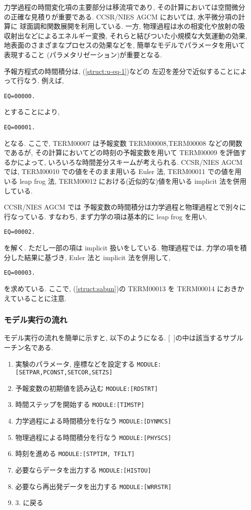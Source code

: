力学過程の時間変化項の主要部分は移流項であり,
その計算においては空間微分の正確な見積りが重要である.
CCSR/NIES AGCM においては, 水平微分項の計算に
球面調和関数展開を利用している.
一方, 物理過程は水の相変化や放射の吸収射出などによるエネルギー変換, 
それらと結びついた小規模な大気運動の効果, 
地表面のさまざまなプロセスの効果などを, 
簡単なモデルでパラメータを用いて表現すること
(パラメタリゼーション)が重要となる.

予報方程式の時間積分は,
(\ref{struct:u-eq-1})などの
左辺を差分で近似することによって行なう. 例えば,
%
\begin{verbatim}
EQ=00000.
\end{verbatim}
%
とすることにより, 
\begin{verbatim}
EQ=00001.
\end{verbatim}
となる. 
ここで, TERM00007 は予報変数 TERM00008,TERM00008 などの関数であるが,
その計算においてどの時刻の予報変数を用いて TERM00009 を評価するかによって,
いろいろな時間差分スキームが考えられる.
CCSR/NIES AGCM では, 
TERM00010 での値をそのまま用いる Euler 法,
TERM00011 での値を用いる leap frog 法, 
TERM00012 における(近似的な)値を用いる implicit 法を併用している.

CCSR/NIES AGCM では
予報変数の時間積分は力学過程と物理過程とで別々に行なっている.
すなわち, まず力学の項は基本的に leap frog を用い,
\begin{verbatim}
EQ=00002.
\end{verbatim}
を解く. ただし一部の項は implicit 扱いをしている.
物理過程では,
力学の項を積分した結果に基づき, 
Euler 法と implicit 法を併用して,
\begin{verbatim}
EQ=00003.
\end{verbatim}
を求めている. 
ここで, (\ref{struct:sabun})の TERM00013 を
TERM00014 におきかえていることに注意.

\subsubsection{モデル実行の流れ}

モデル実行の流れを簡単に示すと, 以下のようになる.
[\ ]の中は該当するサブルーチン名である.

\begin{enumerate}
\item 実験のパラメータ, 座標などを設定する \texttt{MODULE:[SETPAR,PCONST,SETCOR,SETZS]}
\item 予報変数の初期値を読み込む \texttt{MODULE:[RDSTRT]}
\item 時間ステップを開始する \texttt{MODULE:[TIMSTP]}
\item 力学過程による時間積分を行なう \texttt{MODULE:[DYNMCS]}
\item 物理過程による時間積分を行なう \texttt{MODULE:[PHYSCS]}
\item 時刻を進める \texttt{MODULE:[STPTIM, TFILT]}
\item 必要ならデータを出力する \texttt{MODULE:[HISTOU]}
\item 必要なら再出発データを出力する \texttt{MODULE:[WRRSTR]}
\item 3. に戻る
\end{enumerate}

